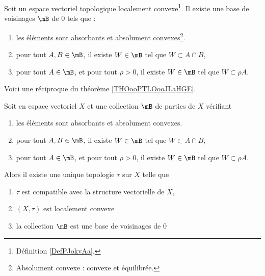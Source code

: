 \begin{theorem}		\label{THOooPTLOooJLaHGE}
	Soit un espace vectoriel topologique localement convexe\footnote{Définition \ref{DefPJokvAa}.}. Il existe une base de voisinages \( \mB\) de \( 0\) tels que :
	\begin{enumerate}
		\item
		      les éléments sont absorbants et absolument convexes\footnote{Absolument convexe : convexe et équilibrée.}.
		\item
		      pour tout \( A,B\in \mB\), il existe \( W\in \mB\) tel que \( W\subset A\cap B\),
		\item
		      pour tout \( A\in \mB\), et pour tout \( \rho>0\), il existe \( W\in \mB\) tel que \( W\subset \rho A\).
	\end{enumerate}
\end{theorem}

\ssdem

Voici une réciproque du théorème \ref{THOooPTLOooJLaHGE}.

\begin{theorem}		\label{THOooKNXGooEebnxI}
	Soit en espace vectoriel \( X\) et une collection \( \mB\) de parties de \( X\) vérifiant
	\begin{enumerate}
		\item
		      les éléments sont absorbants et absolument convexes.
		\item
		      pour tout \( A,B\in \mB\), il existe \( W\in \mB\) tel que \( W\subset A\cap B\),
		\item
		      pour tout \( A\in \mB\), et pour tout \( \rho>0\), il existe \( W\in \mB\) tel que \( W\subset \rho A\).
	\end{enumerate}
	Alors il existe une unique topologie \( \tau\) sur \( X\) telle que
	\begin{enumerate}
		\item
		      \( \tau\) est compatible avec la structure vectorielle de \( X\),
		\item
		      \( (X,\tau)\) est localement convexe
		\item
		      la collection \( \mB\) est une base de voisinages de \( 0\)
	\end{enumerate}
\end{theorem}




